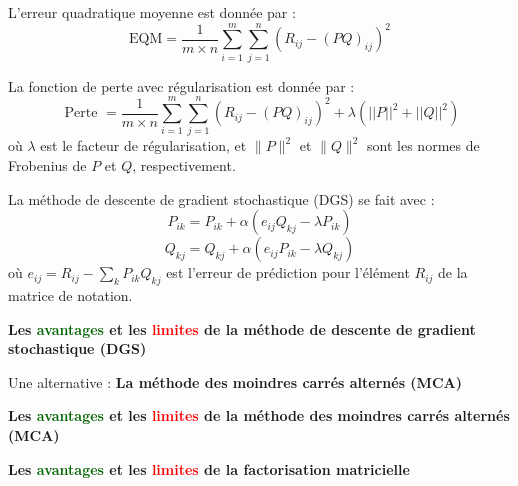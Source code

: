 \begin{frame}{\PartII}
	L'erreur quadratique moyenne est donnée par :
	\begin{equation*}
	\mathrm{EQM}=\frac{1}{m \times n} \sum_{i=1}^m \sum_{j=1}^n\left(R_{i j}-(P Q)_{i j}\right)^2
 	\end{equation*}
	
\end{frame}

\begin{frame}{\PartII}
	La fonction de perte avec régularisation est donnée par :
	\begin{equation*}
		\text { Perte }=\frac{1}{m \times n} \sum_{i=1}^m \sum_{j=1}^n\left(R_{i j}-(P Q)_{i j}\right)^2+\lambda\left(||P||^2+||Q||^2\right)
	\end{equation*}
	où $\lambda$ est le facteur de régularisation, et $\|P\|^2$ et $\|Q\|^2$ sont les normes de Frobenius de $P$ et $Q$, respectivement.
\end{frame}

\begin{frame}{\PartII}
	La méthode de descente de gradient stochastique (DGS) se fait avec :
	\begin{equation*}
		P_{i k}=P_{i k}+\alpha\left(e_{i j} Q_{k j}-\lambda P_{i k}\right) 
	\end{equation*}
	\begin{equation*}
		Q_{k j}=Q_{k j}+\alpha\left(e_{i j} P_{i k}-\lambda Q_{k j}\right)
	\end{equation*}
	où $e_{i j}=R_{i j}-\sum_k P_{i k} Q_{k j}$ est l'erreur de prédiction pour l'élément $R_{i j}$ de la matrice de notation.
\end{frame}

\begin{frame}{\PartII}
	\begin{center}
		\textbf{\large{Les \textcolor{darkgreen}{avantages} et les \textcolor{red}{limites} de la méthode de descente de gradient stochastique (DGS)}}
	\end{center}
\end{frame}

\begin{frame}{\PartII}
	\begin{center}
		\large{Une alternative : \textbf{La méthode des moindres carrés alternés (MCA)}}
	\end{center}
\end{frame}

\begin{frame}{\PartII}
	\begin{center}
		\textbf{\large{Les \textcolor{darkgreen}{avantages} et les \textcolor{red}{limites} de la méthode des moindres carrés alternés (MCA)}}
	\end{center}
\end{frame}

\begin{frame}{\PartII}
	\begin{center}
		\textbf{\large{Les \textcolor{darkgreen}{avantages} et les \textcolor{red}{limites} de la factorisation matricielle}}
	\end{center}
\end{frame}